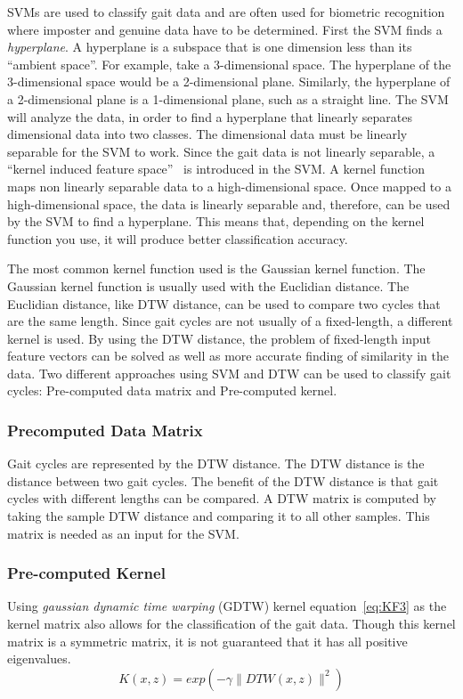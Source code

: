 \documentclass{sig-alternate}
\begin{document}
	SVMs are used to classify gait data and are often used for biometric recognition where imposter and genuine data have to be determined. First the SVM finds a \textit{hyperplane}. A hyperplane is a subspace that is one dimension less than its ``ambient space''. For example, take a 3-dimensional space. The hyperplane of the 3-dimensional space would be a 2-dimensional plane. Similarly, the hyperplane of a 2-dimensional plane is a 1-dimensional plane, such as a straight line. The SVM will analyze the data, in order to find a hyperplane that linearly separates dimensional data into two classes. The dimensional data must be linearly separable for the SVM to work. Since the gait data is not linearly separable, a ``kernel induced feature space''~\cite{Muaaz:2013} is introduced in the SVM. A kernel function maps non linearly separable data to a high-dimensional space. Once mapped to a high-dimensional space, the data is linearly separable and, therefore, can be used by the SVM to find a hyperplane. This means that, depending on the kernel function you use, it will produce better classification accuracy. 

The most common kernel function used is the Gaussian kernel function. The Gaussian kernel function is usually used with the Euclidian distance. The Euclidian distance, like DTW distance, can be used to compare two cycles that are the same length. Since gait cycles are not usually of a fixed-length, a different kernel is used. By using the DTW distance, the problem of fixed-length input feature vectors can be solved as well as more accurate finding of similarity in the data. Two different approaches using SVM and DTW can be used to classify gait cycles: Pre-computed data matrix and Pre-computed kernel.

\subsubsection*{Precomputed Data Matrix}
	Gait cycles are represented by the DTW distance. The DTW distance is the distance between two gait cycles. The benefit of the DTW distance is that gait cycles with different lengths can be compared. A DTW matrix is computed by taking the sample DTW distance and comparing it to all other samples. This matrix is needed as an input for the SVM.	

\subsubsection*{Pre-computed Kernel}
Using \textit{gaussian dynamic time warping} (GDTW) kernel equation~\eqref{eq:KF3} as the kernel matrix also allows for the classification of the gait data. Though this kernel matrix is a symmetric matrix, it is not guaranteed that it has all positive eigenvalues. 
\begin{equation} \label{eq:KF3}
K(x,z)=exp(-\gamma \parallel DTW(x,z) \parallel ^2)
\end{equation}	
\end{document}
